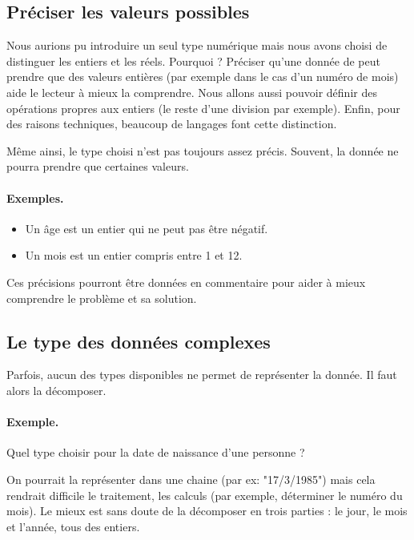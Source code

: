 		\subsection{Préciser les valeurs possibles}
		
			Nous aurions pu introduire un seul type numérique
			mais nous avons choisi de distinguer les entiers et les réels.
			Pourquoi ?
			Préciser qu'une donnée de peut prendre que des valeurs entières
			(par exemple dans le cas d'un numéro de mois)
			aide le lecteur à mieux la comprendre.
			Nous allons aussi pouvoir définir des opérations propres aux entiers
			(le reste d'une division par exemple).
			Enfin, pour des raisons techniques,
			beaucoup de langages font cette distinction.
			
			Même ainsi, le type choisi n'est pas toujours assez précis.
			Souvent, la donnée ne pourra prendre que certaines valeurs.
			
			\begin{Emphase}
				\paragraph{Exemples.}	
				\begin{itemize} 
				\item Un âge est un entier qui ne peut pas être négatif.
				\item Un mois est un entier compris entre 1 et 12.
				\end{itemize}
			\end{Emphase}
			
			Ces précisions pourront être données en commentaire
			pour aider à mieux comprendre le problème et sa solution.
	
		\subsection{Le type des données complexes}
		
			Parfois, aucun des types disponibles ne permet de représenter 
			la donnée.
			Il faut alors la décomposer.
			
			\begin{Emphase}
				\paragraph{Exemple.}	
				Quel type choisir 
				pour la date de naissance d'une personne ?
				
				On pourrait la représenter dans une chaine 
				(par ex: "17/3/1985")
				mais cela rendrait difficile le traitement, les calculs
				(par exemple, déterminer le numéro du mois).
				Le mieux est sans doute de la décomposer en trois parties : 
				le jour, le mois et l'année, tous des entiers.
			\end{Emphase}
			
